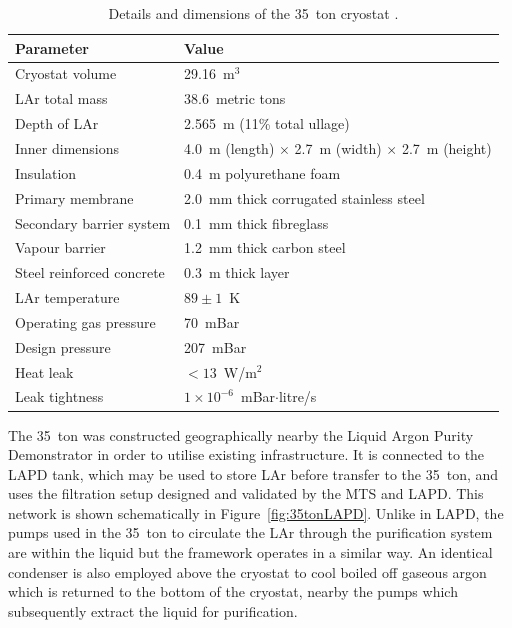 \begin{table}
  \caption[Details and dimensions of the 35~ton cryostat.]{Details and dimensions of the 35~ton cryostat \cite{35tonPhaseI2015}.}
  \label{tab:35tonCryostat}
  \centering
  \begin{tabular}{ l l }
    \toprule
    Parameter & Value \\
    \midrule
    Cryostat volume           & 29.16~m$^3$ \\
    LAr total mass            & 38.6~metric tons \\
    Depth of LAr              & 2.565~m (11\% total ullage) \\
    Inner dimensions          & 4.0~m (length) $\times$ 2.7~m (width) $\times$ 2.7~m (height) \\
    Insulation                & 0.4~m polyurethane foam \\
    Primary membrane          & 2.0~mm thick corrugated stainless steel \\
    Secondary barrier system  & 0.1~mm thick fibreglass \\
    Vapour barrier             & 1.2~mm thick carbon steel \\
    Steel reinforced concrete & 0.3~m thick layer \\
    LAr temperature           & $89\pm1$~K \\
    Operating gas pressure    & 70~mBar \\
    Design pressure           & 207~mBar \\
    Heat leak                 & $<13$~W/m$^2$ \\
    Leak tightness            & $1\times10^{-6}$~mBar$\cdot$litre/s \\
    \bottomrule
  \end{tabular}
\end{table}

The 35~ton was constructed geographically nearby the Liquid Argon Purity Demonstrator in order to utilise existing infrastructure.  It is connected to the LAPD tank, which may be used to store LAr before transfer to the 35~ton, and uses the filtration setup designed and validated by the MTS and LAPD.  This network is shown schematically in Figure~\ref{fig:35tonLAPD}.  Unlike in LAPD, the pumps used in the 35~ton to circulate the LAr through the purification system are within the liquid but the framework operates in a similar way.  An identical condenser is also employed above the cryostat to cool boiled off gaseous argon which is returned to the bottom of the cryostat, nearby the pumps which subsequently extract the liquid for purification.

